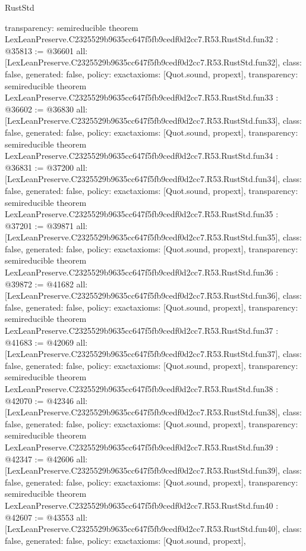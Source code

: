 \begin{lexlean}{RustStd}
\begin{coremodule}
{  transparency: semireducible
}
theorem LexLeanPreserve.C2325529b9635cc647f5fb9cedf0d2cc7.R53.RustStd.fun32 : @35813 := @36601 {
  all: [LexLeanPreserve.C2325529b9635cc647f5fb9cedf0d2cc7.R53.RustStd.fun32],
  class: false,
  generated: false,
  policy: exact{axioms: [Quot.sound, propext]},
  transparency: semireducible
}
theorem LexLeanPreserve.C2325529b9635cc647f5fb9cedf0d2cc7.R53.RustStd.fun33 : @36602 := @36830 {
  all: [LexLeanPreserve.C2325529b9635cc647f5fb9cedf0d2cc7.R53.RustStd.fun33],
  class: false,
  generated: false,
  policy: exact{axioms: [Quot.sound, propext]},
  transparency: semireducible
}
theorem LexLeanPreserve.C2325529b9635cc647f5fb9cedf0d2cc7.R53.RustStd.fun34 : @36831 := @37200 {
  all: [LexLeanPreserve.C2325529b9635cc647f5fb9cedf0d2cc7.R53.RustStd.fun34],
  class: false,
  generated: false,
  policy: exact{axioms: [Quot.sound, propext]},
  transparency: semireducible
}
theorem LexLeanPreserve.C2325529b9635cc647f5fb9cedf0d2cc7.R53.RustStd.fun35 : @37201 := @39871 {
  all: [LexLeanPreserve.C2325529b9635cc647f5fb9cedf0d2cc7.R53.RustStd.fun35],
  class: false,
  generated: false,
  policy: exact{axioms: [Quot.sound, propext]},
  transparency: semireducible
}
theorem LexLeanPreserve.C2325529b9635cc647f5fb9cedf0d2cc7.R53.RustStd.fun36 : @39872 := @41682 {
  all: [LexLeanPreserve.C2325529b9635cc647f5fb9cedf0d2cc7.R53.RustStd.fun36],
  class: false,
  generated: false,
  policy: exact{axioms: [Quot.sound, propext]},
  transparency: semireducible
}
theorem LexLeanPreserve.C2325529b9635cc647f5fb9cedf0d2cc7.R53.RustStd.fun37 : @41683 := @42069 {
  all: [LexLeanPreserve.C2325529b9635cc647f5fb9cedf0d2cc7.R53.RustStd.fun37],
  class: false,
  generated: false,
  policy: exact{axioms: [Quot.sound, propext]},
  transparency: semireducible
}
theorem LexLeanPreserve.C2325529b9635cc647f5fb9cedf0d2cc7.R53.RustStd.fun38 : @42070 := @42346 {
  all: [LexLeanPreserve.C2325529b9635cc647f5fb9cedf0d2cc7.R53.RustStd.fun38],
  class: false,
  generated: false,
  policy: exact{axioms: [Quot.sound, propext]},
  transparency: semireducible
}
theorem LexLeanPreserve.C2325529b9635cc647f5fb9cedf0d2cc7.R53.RustStd.fun39 : @42347 := @42606 {
  all: [LexLeanPreserve.C2325529b9635cc647f5fb9cedf0d2cc7.R53.RustStd.fun39],
  class: false,
  generated: false,
  policy: exact{axioms: [Quot.sound, propext]},
  transparency: semireducible
}
theorem LexLeanPreserve.C2325529b9635cc647f5fb9cedf0d2cc7.R53.RustStd.fun40 : @42607 := @43553 {
  all: [LexLeanPreserve.C2325529b9635cc647f5fb9cedf0d2cc7.R53.RustStd.fun40],
  class: false,
  generated: false,
  policy: exact{axioms: [Quot.sound, propext]},
}
\end{coremodule}
\end{lexlean}
